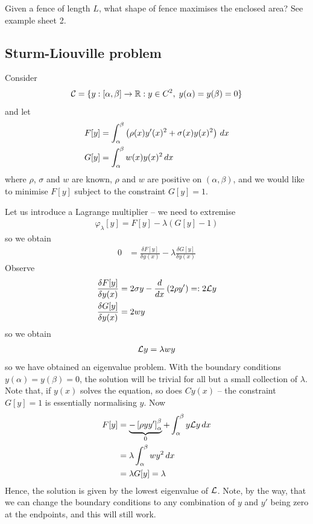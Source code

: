\documentclass{../../template/note}
\begin{document}
    \begin{example*}
        Given a fence of length $L$, what shape of fence maximises the enclosed area? See example sheet 2.
    \end{example*}
    
    \subsection{Sturm-Liouville problem}
    \label{sturm-liouville}

    Consider
    \begin{align*}
        \mathcal{C} = \{y: [\alpha, \beta] \to \mathbb R: y \in C^2,\; y(\alpha) = y(\beta) = 0\}
    \end{align*}
    and let
    \begin{align*}
        F[y] &= \int_\alpha^\beta \left(\rho(x) y'(x)^2 + \sigma(x) y(x)^2\right) \,d{x} \\
        G[y] &= \int_\alpha^\beta w(x) y(x)^2 \,d{x} 
    \end{align*}
    where $\rho$, $\sigma$ and $w$ are known, $\rho$ and $w$ are positive on $(\alpha, \beta)$, and we would like to minimise $F[y]$ subject to the constraint $G[y] = 1$.

    Let us introduce a Lagrange multiplier -- we need to extremise
    \begin{align*}
        \varphi_\lambda[y] = F[y] - \lambda(G[y]-1)
    \end{align*}
    so we obtain
    \begin{align*}
        0 &= \frac{\delta F[y]}{\delta y(x)} - \lambda \frac{\delta G[y]}{\delta y(x)}
    \end{align*}
    Observe
    \begin{align*}
        \frac{\delta F[y]}{\delta y(x)} &= 2\sigma y - \frac{d}{dx}\left(2 \rho y'\right) =: 2 \mathcal{L} y \\
        \frac{\delta G[y]}{\delta y(x)} &= 2wy
    \end{align*}
    so we obtain
    \begin{align*}
        \mathcal{L} y = \lambda w y
    \end{align*}
    so we have obtained an eigenvalue problem. With the boundary conditions $y(\alpha) = y(\beta) = 0$, the solution will be trivial for all but a small collection of $\lambda$. Note that, if $y(x)$ solves the equation, so does $Cy(x)$ -- the constraint $G[y] = 1$ is essentially normalising $y$. Now
    \begin{align*}
        F[y] &= \underbrace{-\left[\rho y y'\right]_\alpha^\beta}_0 + \int_\alpha^\beta y\mathcal{L} y \,d{x} \\
        &= \lambda \int_\alpha^\beta wy^2 \,d{x} \\
        &= \lambda G[y] = \lambda
    \end{align*}
    Hence, the solution is given by the lowest eigenvalue of $\mathcal{L}$. Note, by the way, that we can change the boundary conditions to any combination of $y$ and $y'$ being zero at the endpoints, and this will still work.
\end{document}
